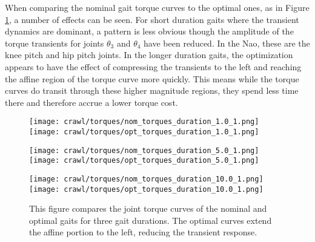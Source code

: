 When comparing the nominal gait torque curves to the optimal ones, as in Figure
\ref{fig:vrep_comparison_joint_torques_by_duration1}, a number of effects can be seen.
For short duration gaits where the transient dynamics are dominant, a pattern is less
obvious though the amplitude of the torque transients for joints $\theta_3$ and $\theta_4$
have been reduced. In the Nao, these are the knee pitch and hip pitch joints.
In the longer duration gaits, the optimization appears to have the effect of compressing
the transients to the left and reaching the affine region of the torque curve more quickly.
This means while the torque curves do transit through these higher magnitude regions,
they spend less time there and therefore accrue a lower torque cost.

\begin{figure}
  \centerline{
    \texttt{[image: crawl/torques/nom\_torques\_duration\_1.0\_1.png]}
    \texttt{[image: crawl/torques/opt\_torques\_duration\_1.0\_1.png]}
  }
  \centerline{
    \texttt{[image: crawl/torques/nom\_torques\_duration\_5.0\_1.png]}
    \texttt{[image: crawl/torques/opt\_torques\_duration\_5.0\_1.png]}
  }
  \centerline{
    \texttt{[image: crawl/torques/nom\_torques\_duration\_10.0\_1.png]}
    \texttt{[image: crawl/torques/opt\_torques\_duration\_10.0\_1.png]}
  }
  \caption{This figure compares the joint torque curves of the nominal and optimal
           gaits for three gait durations. The optimal curves extend the affine portion to the left, 
           reducing the transient response.}
  \label{fig:vrep_comparison_joint_torques_by_duration1}
\end{figure}


